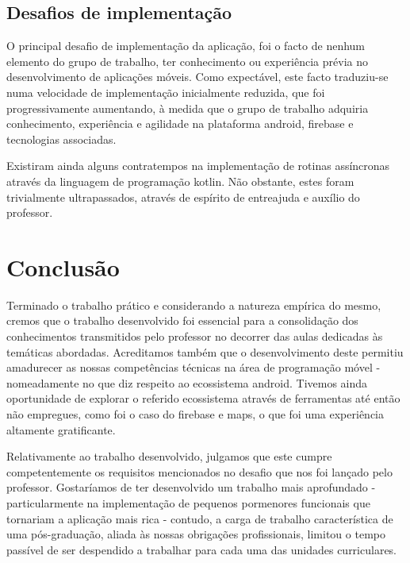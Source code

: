 \documentclass[12pt]{report}
\begin{document}
\clearpage

\section{Desafios de implementação}

O principal desafio de implementação da aplicação, foi o facto de nenhum elemento do grupo de trabalho, ter  conhecimento ou experiência prévia no desenvolvimento de aplicações móveis. Como expectável, este facto traduziu-se numa velocidade de implementação inicialmente reduzida, que foi progressivamente aumentando, à medida que o grupo de trabalho adquiria conhecimento, experiência e agilidade na plataforma \gls{android}, \gls{firebase} e tecnologias associadas.

Existiram ainda alguns contratempos na implementação de rotinas assíncronas através da linguagem de programação \gls{kotlin}. Não obstante, estes foram trivialmente ultrapassados, através de espírito de entreajuda e auxílio do professor.


\chapter{Conclusão}

Terminado o trabalho prático e considerando a natureza empírica do mesmo, cremos que o trabalho desenvolvido foi essencial para a consolidação dos conhecimentos transmitidos pelo professor no decorrer das aulas dedicadas às temáticas abordadas. Acreditamos também que o desenvolvimento deste permitiu amadurecer as nossas competências técnicas na área de programação móvel - nomeadamente no que diz respeito ao ecossistema \gls{android}. Tivemos ainda oportunidade de explorar o referido ecossistema através de ferramentas até então não empregues, como foi o caso do \gls{firebase} e \gls{maps}, o que foi uma experiência altamente gratificante.

Relativamente ao trabalho desenvolvido, julgamos que este cumpre competentemente os requisitos mencionados no desafio que nos foi lançado pelo professor. Gostaríamos de ter desenvolvido um trabalho mais aprofundado - particularmente na implementação de pequenos pormenores funcionais que tornariam a aplicação mais rica - contudo, a carga de trabalho característica de uma pós-graduação, aliada às nossas obrigações profissionais, limitou o tempo passível de ser despendido a trabalhar para cada uma das unidades curriculares.



\nocite{*}
\end{document}
